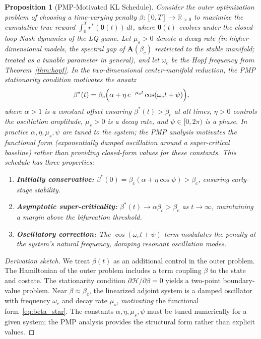 \documentclass[10pt]{article}
\newcommand{\btheta}{\bm{\theta}}
\newcommand{\bA}{\bm{A}}
\newcommand{\cH}{\mathcal{H}}
\newcommand{\R}{\mathbb{R}}
\newtheorem{proposition}{Proposition}
\begin{document}
\begin{proposition}[PMP-Motivated KL Schedule]
\label{prop:schedule}
Consider the outer optimization problem of choosing a time-varying penalty $\beta: [0, T] \to \R_{>0}$ to maximize the cumulative true reward $\int_0^T r^*(\btheta(t))\,dt$, where $\btheta(t)$ evolves under the closed-loop Nash dynamics of the LQ game.
Let $\mu_s > 0$ denote a decay rate (in higher-dimensional models, the spectral gap of $\bA(\beta_c)$ restricted to the stable manifold; treated as a tunable parameter in general), and let $\omega_c$ be the Hopf frequency from Theorem~\ref{thm:hopf}.
In the two-dimensional center-manifold reduction, the PMP stationarity condition motivates the ansatz
\begin{equation}
  \beta^*(t) = \beta_c\Bigl(\alpha + \eta\,e^{-\mu_s t}\cos(\omega_c t + \psi)\Bigr),
  \label{eq:beta_star}
\end{equation}
where $\alpha > 1$ is a constant offset ensuring $\beta^*(t) > \beta_c$ at all times, $\eta > 0$ controls the oscillation amplitude, $\mu_s > 0$ is a decay rate, and $\psi \in [0, 2\pi)$ is a phase.
In practice $\alpha, \eta, \mu_s, \psi$ are tuned to the system; the PMP analysis motivates the \emph{functional form} (exponentially damped oscillation around a super-critical baseline) rather than providing closed-form values for these constants.
This schedule has three properties:
\begin{enumerate}[leftmargin=1.5em,itemsep=1pt]
  \item \textbf{Initially conservative:} $\beta^*(0) = \beta_c(\alpha + \eta\cos\psi) > \beta_c$, ensuring early-stage stability.
  \item \textbf{Asymptotic super-criticality:} $\beta^*(t) \to \alpha\beta_c > \beta_c$ as $t \to \infty$, maintaining a margin above the bifurcation threshold.
  \item \textbf{Oscillatory correction:} The $\cos(\omega_c t + \psi)$ term modulates the penalty at the system's natural frequency, damping resonant oscillation modes.
\end{enumerate}
\end{proposition}

\begin{proof}[Derivation sketch]
We treat $\beta(t)$ as an additional control in the outer problem.
The Hamiltonian of the outer problem includes a term coupling $\beta$ to the state and costate.
The stationarity condition $\partial \cH / \partial \beta = 0$ yields a two-point boundary-value problem.
Near $\beta \approx \beta_c$, the linearized adjoint system is a damped oscillator with frequency $\omega_c$ and decay rate $\mu_s$, \emph{motivating} the functional form~\eqref{eq:beta_star}.
The constants $\alpha, \eta, \mu_s, \psi$ must be tuned numerically for a given system; the PMP analysis provides the structural form rather than explicit values.
\end{proof}
\end{document}
